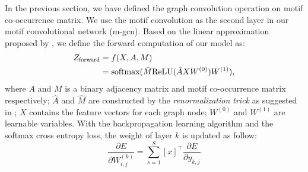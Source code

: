 \documentclass{article}
\theoremstyle{definition}
\begin{document}
In the previous section, we have defined the graph convolution
operation on motif co-occurrence matrix. We use the motif convolution
as the second layer in our motif convolutional network (m-gcn). Based on the 
linear approximation proposed by \citeauthor{gcn}, we define the forward
computation of our model as:
\begin{equation} \label{eq:2}
    \begin{aligned}
    Z_{\scalebox{0.75}{forward}} &= f(X,A,M) \\
    &= \mbox{softmax}(\hat{M} \mbox{ReLU}(\hat{A}XW^{(0)})W^{(1)}),
    \end{aligned}
\end{equation}
where $A$ and $M$ is a binary adjacency matrix and motif co-occurrence
matrix respectively; $\hat{A}$ and $\hat{M}$ are constructed by the
\emph{renormalization trick} as suggested in \cite{gcn}; $X$ contains
the feature vectors for each graph node; $W^{(0)}$ and $W^{(1)}$ are
learnable variables. With the backpropagation learning algorithm and the
softmax cross entropy loss, the weight of layer $k$ is updated as follow: 
\begin{equation}
\label{eq:3}
\frac{\partial E}{\partial W^{(k)}_{i,j}} = \sum^S_{s=1} [x]^\top \frac{\partial E}{\partial y_{k,j}}
\end{equation}

\begin{table}
\centering
{}
\caption{Accuracy score for multi-class labeling}
\label{t:re}
\end{table}
\end{document}
